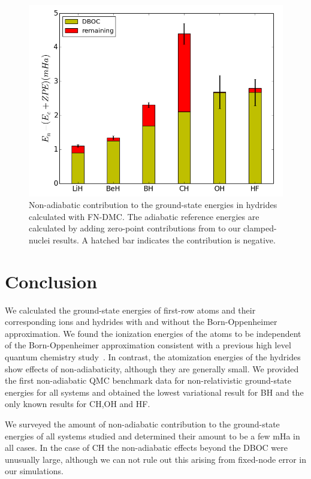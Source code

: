\documentclass[pra,superscriptaddress,groupedaddress,twocolumn]{revtex4-1}
\begin{document}
\begin{figure}[h]
\includegraphics[scale=.37]{Figures/dia-nad-ad}
\caption{Non-adiabatic contribution to the ground-state energies in hydrides calculated with FN-DMC. The adiabatic reference energies are calculated by adding zero-point contributions from \cite{Feller_Corrections} to our clamped-nuclei results. A hatched bar indicates the contribution is negative. \label{fig:dia-nad-ad}}
\end{figure}

\section{Conclusion}
We calculated the ground-state energies of first-row atoms and their corresponding ions and hydrides with and without the Born-Oppenheimer approximation. We found the ionization energies of the atoms to be independent of the Born-Oppenheimer approximation consistent with a previous high level quantum chemistry study~\cite{Klopper_IP}.  
In contrast, the atomization energies of the hydrides show effects of non-adiabaticity, although they are generally small. We provided the first non-adiabatic QMC benchmark data for non-relativistic ground-state energies for all systems and obtained the lowest variational result for BH and the only known results for CH,OH and HF.

We surveyed the amount of non-adiabatic contribution to the ground-state energies of all systems studied and determined their amount to be a few mHa in all cases. 
In the case of CH the non-adiabatic effects beyond the DBOC were unusually large, although we can not rule out this arising from fixed-node error in our simulations.
\end{document}
